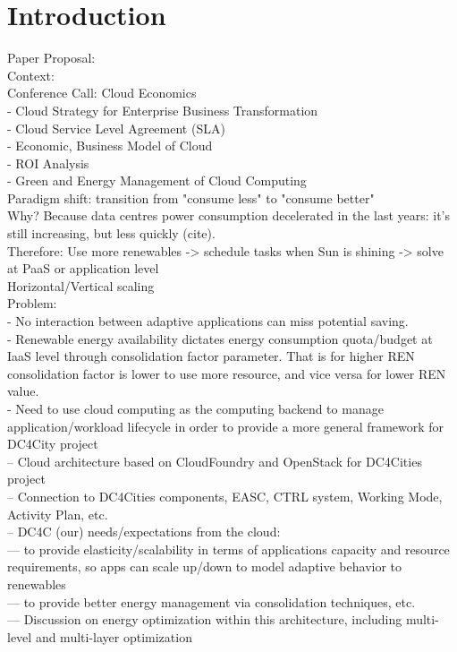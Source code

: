 \section{Introduction}
\label{sec: intro}
Paper Proposal: \\
Context: \\
  Conference Call: Cloud Economics \\
- Cloud Strategy for Enterprise Business Transformation \\
- Cloud Service Level Agreement (SLA) \\
- Economic, Business Model of Cloud \\
- ROI Analysis \\
- Green and Energy Management of Cloud Computing \\

Paradigm shift: transition from "consume less" to "consume better" \\
Why? Because data centres power consumption decelerated in the last years: it's still increasing, but less quickly (cite). \\

Therefore: Use more renewables -> schedule tasks when Sun is shining -> solve at PaaS or application level \\
Horizontal/Vertical scaling \\

Problem: \\
- No interaction between adaptive applications can miss potential saving. \\
- Renewable energy availability dictates energy consumption quota/budget at IaaS level through consolidation factor parameter. That is for higher REN consolidation factor is lower to use more resource, and vice versa for lower REN value. \\
- Need to use cloud computing as the computing backend to manage application/workload lifecycle in order to provide a more general framework for DC4City project \\
-- Cloud architecture based on CloudFoundry and OpenStack for DC4Cities project \\
-- Connection to DC4Cities components, EASC, CTRL system, Working Mode, Activity Plan, etc. \\
-- DC4C (our) needs/expectations from the cloud: \\
--- to provide elasticity/scalability in terms of applications capacity and resource requirements, so apps can scale up/down to model adaptive behavior to renewables \\
--- to provide better energy management via consolidation techniques, etc. \\
--- Discussion on energy optimization within this architecture, including multi-level and multi-layer optimization \\


